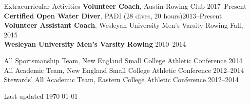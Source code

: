\documentclass{resume} %
\begin{document}
\begin{rSection}{Extracurricular Activities} \itemsep -5pt  
{\bf Volunteer Coach}, Austin Rowing Club \hfill {2017--Present}\\
{\bf Certified Open Water Diver}, PADI (28 dives, 20 hours)\hfill {2013--Present}\\
{\bf Volunteer Assistant Coach}, Wesleyan University Men's Varsity Rowing \hfill {Fall, 2015}\\
{\bf Wesleyan University Men's Varsity Rowing} \hfill{2010--2014}
\begin{itemize}
\vspace{-6pt}
    \setlength\itemsep{-4pt}
All Sportsmanship Team, New England Small College Athletic Conference \hfill {2014}\\
All Academic Team, New England Small College Athletic Conference \hfill {2012--2014}\\
Stewards' All Academic Team, Eastern College Athletic Conference \hfill {2012--2014}\\
\end{itemize}
\end{rSection}

\vspace{-25pt}
\vfill
{\scriptsize Last updated \today}
\vspace{-10pt}
\end{document}
